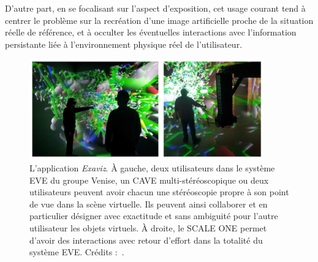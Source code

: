 \begin{appendices}
\begin{displayquote}
	    D'autre part, en se focalisant sur l'aspect d'exposition, cet usage courant tend à centrer le problème sur la recréation d'une image artificielle proche de la situation réelle de référence, et à occulter les éventuelles interactions avec l'information persistante liée à l'environnement physique réel de l'utilisateur.	    
	\end{displayquote}

	\begin{figure}[htbp]
		\centering
		\includegraphics[width=0.9\textwidth]{figures/ch1/exaviz}
		\caption[IMD en environnement virtuel avec retour haptique, \emph{Exaviz}]{L'application \emph{Exaviz}. À gauche, deux utilisateurs dans le système EVE\footnotemark{} du groupe Venise, un CAVE multi-stéréoscopique ou deux utilisateurs peuvent avoir chacun une stéréoscopie propre à son point de vue dans la scène virtuelle. Ils peuvent ainsi collaborer et en particulier désigner avec exactitude et sans ambiguité pour l'autre utilisateur les objets virtuels. À droite, le SCALE ONE permet d'avoir des interactions avec retour d'effort dans la totalité du système EVE. Crédits :~\cite{dreher2014exaviz, cazauxsysteme}.}
		\label{fig:exaviz}
	\end{figure}
	
\end{appendices}
